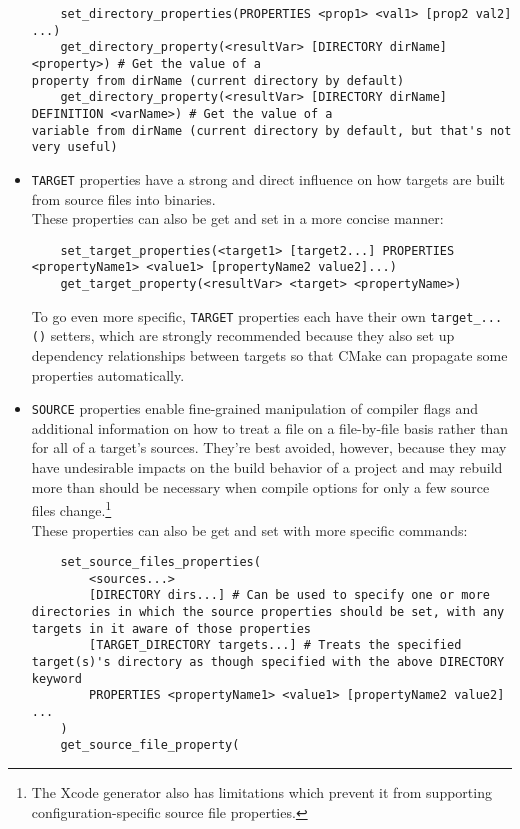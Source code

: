 \documentclass[8pt, table, xcdraw]{article}%
\begin{document}
\begin{itemize}
    \begin{lstlisting}
    set_directory_properties(PROPERTIES <prop1> <val1> [prop2 val2] ...)
    get_directory_property(<resultVar> [DIRECTORY dirName] <property>) # Get the value of a
property from dirName (current directory by default)
    get_directory_property(<resultVar> [DIRECTORY dirName] DEFINITION <varName>) # Get the value of a
variable from dirName (current directory by default, but that's not very useful)
    \end{lstlisting}
    \item \lstinline{TARGET} properties have a strong and direct influence on how targets are built from source files into binaries.\\
    These properties can also be get and set in a more concise manner:
    \begin{lstlisting}
    set_target_properties(<target1> [target2...] PROPERTIES <propertyName1> <value1> [propertyName2 value2]...)
    get_target_property(<resultVar> <target> <propertyName>)
    \end{lstlisting}
    To go even more specific, \lstinline{TARGET} properties each have their own \lstinline{target_...()} setters, which are strongly recommended because they also set up dependency relationships between targets so that CMake can propagate some properties automatically.
    \item \lstinline{SOURCE} properties enable fine-grained manipulation of compiler flags and additional information on how to treat a file on a file-by-file basis rather than for all of a target’s sources. They're best avoided, however, because they may have undesirable impacts on the build behavior of a project and may rebuild more than should be necessary when compile options for only a few source files change.\footnote{The Xcode generator also has limitations which prevent it from supporting configuration-specific source file properties.}\\
    These properties can also be get and set with more specific commands:
    \begin{lstlisting}
    set_source_files_properties(
        <sources...>
        [DIRECTORY dirs...] # Can be used to specify one or more directories in which the source properties should be set, with any targets in it aware of those properties
        [TARGET_DIRECTORY targets...] # Treats the specified target(s)'s directory as though specified with the above DIRECTORY keyword
        PROPERTIES <propertyName1> <value1> [propertyName2 value2] ...
    )
    get_source_file_property(

\end{lstlisting}
\end{itemize}
\end{document}
